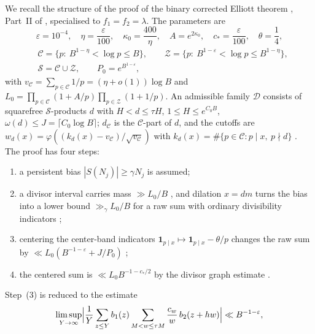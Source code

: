 We recall the structure of the proof of the binary corrected Elliott theorem \cite[Theorem~1.2, p.~4]{OpenAI2026}, Part~II of \cite{OpenAI2026}, specialised to $f_1=f_2=\lambda$. The parameters are \cite[(10.1)--(10.2), p.~44]{OpenAI2026}
\begin{equation}
\varepsilon=10^{-4},\quad \eta=\frac{\varepsilon}{100},\quad \kappa_0=\frac{400}{\eta},\quad A=e^{2\kappa_0},\quad c_*=\frac{\varepsilon}{100},\quad \theta=\frac14,
\label{eq:oai_params}
\end{equation}
\begin{equation}
\begin{aligned}
&\mathcal C=\{p:\ B^{1-\eta}<\log p\le B\},\qquad \mathcal Z=\{p:\ B^{1-\varepsilon}<\log p\le B^{1-\eta}\},\\
&\mathcal S=\mathcal C\cup\mathcal Z,\qquad P_0=e^{B^{1-\varepsilon}},
\end{aligned}
\label{eq:oai_primes}
\end{equation}
with $v_{\mathcal C}=\sum_{p\in\mathcal C}1/p=(\eta+o(1))\log B$ and $L_0=\prod_{p\in\mathcal C}(1+A/p)\prod_{p\in\mathcal Z}(1+1/p)$. An admissible family $\mathcal D$ consists of squarefree $\mathcal S$-products $d$ with $H<d\le\tau H$, $1\le H\le e^{C_0B}$, $\omega(d)\le J=\lceil C_0\log B\rceil$; $d_{\mathcal C}$ is the $\mathcal C$-part of $d$, and the cutoffs are $w_d(x)=\varphi((k_d(x)-v_{\mathcal C})/\sqrt{v_{\mathcal C}})$ with $k_d(x)=\#\{p\in\mathcal C:p\mid x,\ p\nmid d\}$ \cite[(10.3)--(10.4), (11.3), pp.~45--47]{OpenAI2026}. The proof has four steps:
\begin{enumerate}
\item a persistent bias $|S(N_j)|\ge\gamma N_j$ is assumed;
\item a divisor interval carries mass $\gg L_0/B$ \cite[Lemma~11.2, p.~47]{OpenAI2026}, and dilation $x=dm$ turns the bias into a lower bound $\gg_\gamma L_0/B$ for a raw sum with ordinary divisibility indicators \cite[Lemma~11.3, p.~48]{OpenAI2026};
\item centering the center-band indicators $\mathbf 1_{p\mid x}\mapsto\mathbf 1_{p\mid x}-\theta/p$ changes the raw sum by $\ll L_0(B^{-1-\varepsilon}+J/P_0)$ \cite[Proposition~11.4, p.~49]{OpenAI2026};
\item the centered sum is $\ll L_0B^{-1-c_*/2}$ by the divisor graph estimate \cite[Proposition~10.1, p.~45]{OpenAI2026}.
\end{enumerate}
Step~(3) is reduced \cite[\S12.1, pp.~50--51]{OpenAI2026} to the estimate
\begin{equation}
\limsup_{Y\to\infty}\Bigl|\frac1Y\sum_{z\le Y}b_1(z)\sum_{M<w\le\tau M}\frac{c_w}{w}\,b_2(z+hw)\Bigr|\ll B^{-1-\varepsilon},
\label{eq:oai124}
\end{equation}
